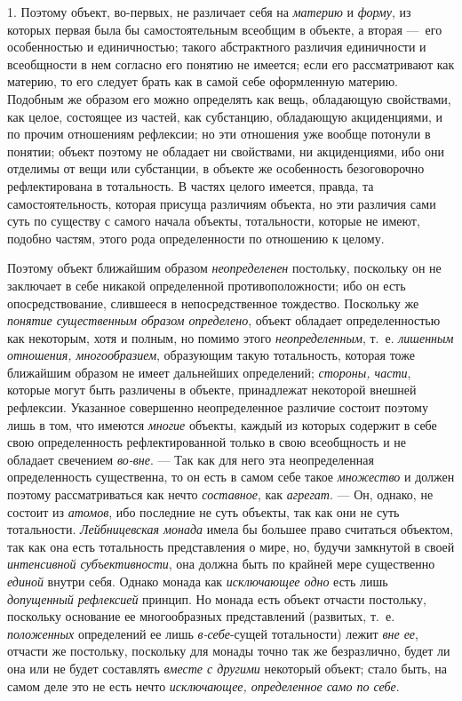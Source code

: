 \documentclass[twoside]{article}
\begin{document}
{{{{{{1. Поэтому объект, во-первых, не различает себя на
{\em материю} и
{\em форму}, из которых
первая была бы самостоятельным всеобщим в объекте, а вторая
—~его особенностью и единичностью; такого абстрактного
различия единичности и всеобщности в нем согласно его понятию не имеется;
если его рассматривают как материю, то его следует брать как в самой себе
оформленную материю. Подобным же образом его можно определять как вещь,
обладающую свойствами, как целое, состоящее из частей, как субстанцию,
обладающую акциденциями, и по прочим отношениям рефлексии; но эти отношения
уже вообще потонули в понятии; объект поэтому не обладает ни свойствами, ни
акциденциями, ибо они отделимы от вещи или субстанции, в объекте же
особенность безоговорочно рефлектирована в тотальность. В частях целого
имеется, правда, та самостоятельность, которая присуща различиям объекта,
но эти различия сами суть по существу с самого начала объекты, тотальности,
которые не имеют, подобно частям, этого рода определенности по отношению к
целому.

Поэтому объект ближайшим образом
{\em неопределенен}
постольку, поскольку он не заключает в себе никакой
определенной противоположности; ибо он есть опосредствование, слившееся в
непосредственное тождество. Поскольку же
{\em понятие существенным образом
определено}, объект обладает определенностью как некоторым,
хотя и полным, но помимо этого
{\em неопределенным},
т.~е. {\em лишенным
отношения, многообразием}, образующим такую тотальность,
которая тоже ближайшим образом не имеет дальнейших определений;
{\em стороны, части},
которые могут быть различены в объекте, принадлежат некоторой
внешней рефлексии. Указанное совершенно неопределенное различие состоит
поэтому лишь в том, что имеются
{\em многие} объекты,
каждый из которых содержит в себе свою определенность рефлектированной
только в свою всеобщность и не обладает свечением
{\em во-вне}. — Так как
для него эта неопределенная определенность существенна, то он есть в самом
себе такое {\em множество}
и должен поэтому рассматриваться как нечто
{\em составное}, как
{\em агрегат}. — Он,
однако, не состоит из {\em атомов},
ибо последние не суть объекты, так как они не суть
тотальности. {\em Лейбницевская монада}
имела бы большее право считаться объектом, так как она есть
тотальность представления о мире, но, будучи замкнутой в своей
{\em интенсивной субъективности},
она должна быть по крайней мере существенно
{\em единой} внутри себя.
Однако монада как {\em исключающее
одно} есть лишь
{\em допущенный рефлексией}
принцип. Но монада есть объект отчасти постольку, поскольку
основание ее многообразных представлений (развитых, т.~е.
{\em положенных}
определений ее лишь
{\em в-себе}{}-сущей
тотальности) лежит {\em вне ее},
отчасти же постольку, поскольку для монады точно так же
безразлично, будет ли она или не будет составлять
{\em вместе с другими}
некоторый объект; стало быть, на самом деле это не есть нечто
{\em исключающее, определенное само по
себе}.

}}}}}}
\end{document}
